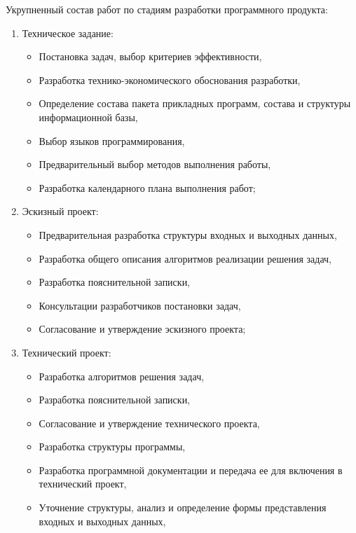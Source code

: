     Укрупненный состав работ по стадиям разработки программного продукта:
    \begin{enumerate}
        \item Техническое задание:
            \begin{itemize}
                \item Постановка задач, выбор критериев эффективности,
                \item Разработка технико-экономического обоснования разработки,
                \item Определение состава пакета прикладных программ, состава и структуры информационной базы,
                \item Выбор языков программирования,
                \item Предварительный выбор методов выполнения работы,
                \item Разработка календарного плана выполнения работ;
            \end{itemize}
        \item Эскизный проект:
            \begin{itemize}
                \item Предварительная разработка структуры входных и выходных данных,
                \item Разработка общего описания алгоритмов реализации решения задач,
                \item Разработка пояснительной записки,
                \item Консультации разработчиков постановки задач,
                \item Согласование и утверждение эскизного проекта;
            \end{itemize}
        \item Технический проект:
            \begin{itemize}
                \item Разработка алгоритмов решения задач,
                \item Разработка пояснительной записки,
                \item Согласование и утверждение технического проекта,
                \item Разработка структуры программы,
                \item Разработка программной документации и передача ее для включения в технический проект,
                \item Уточнение структуры, анализ и определение формы представления входных и выходных данных,

\end{itemize}
\end{enumerate}
